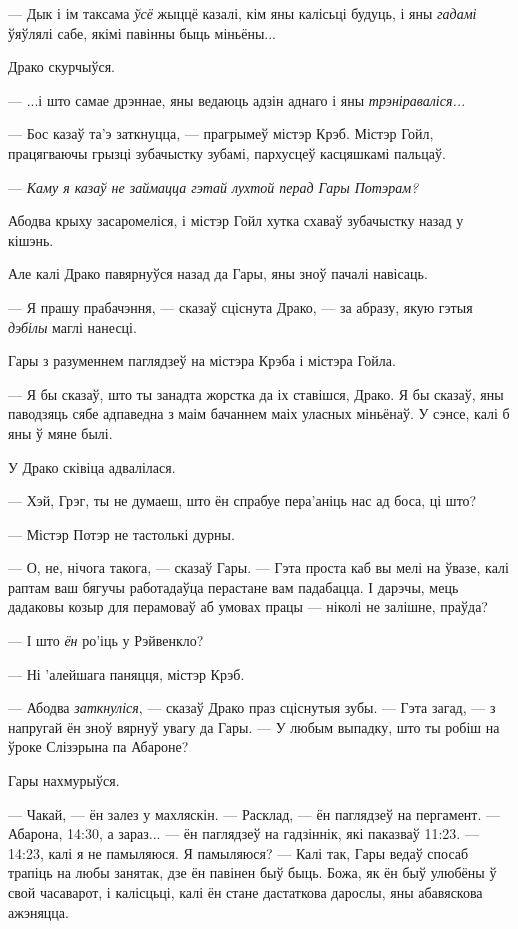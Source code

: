 --- Дык і ім таксама \emph{ўсё} жыццё казалі, кім яны калісьці будуць,
і яны \emph{гадамі} ўяўлялі сабе, якімі павінны быць міньёны...

Драко скурчыўся.

--- ...і што самае дрэннае, яны ведаюць адзін аднаго і яны \emph{трэніраваліся...}

--- Бос казаў та'э заткнуцца, --- прагрымеў містэр Крэб. Містэр Гойл, працягваючы 
грызці зубачыстку зубамі, пархусцеў касцяшкамі пальцаў.

--- \emph{Каму я казаў не займацца гэтай лухтой перад Гары Потэрам?}

Абодва крыху засаромеліся, і містэр Гойл хутка схаваў зубачыстку назад у кішэнь.

Але калі Драко павярнуўся назад да Гары, яны зноў пачалі навісаць.

--- Я прашу прабачэння, --- сказаў сціснута Драко, --- за абразу,
якую гэтыя \emph{дэбілы} маглі нанесці.

Гары з разуменнем паглядзеў на містэра Крэба і містэра Гойла. 

--- Я бы сказаў, што ты занадта жорстка да іх ставішся, Драко. Я бы сказаў, яны 
паводзяць сябе адпаведна з маім бачаннем маіх уласных міньёнаў. У сэнсе, 
калі б яны ў мяне былі.

У Драко сківіца адвалілася.

--- Хэй, Грэг, ты не думаеш, што ён спрабуе пера'аніць нас ад боса, ці што?

--- Містэр Потэр не тастолькі дурны.

--- О, не, нічога такога, --- сказаў Гары. --- Гэта проста каб вы мелі на ўвазе, 
калі раптам ваш бягучы работадаўца перастане вам падабацца. І дарэчы, мець 
дадаковы козыр для перамоваў аб умовах працы --- 
ніколі не залішне, праўда?

--- І што \emph{ён} ро'іць у Рэйвенкло?

--- Ні 'алейшага паняцця, містэр Крэб.

--- Абодва \emph{заткнуліся}, --- сказаў Драко праз сціснутыя зубы. --- Гэта загад, ---
з напругай ён зноў вярнуў увагу да Гары. --- У любым выпадку,
што ты робіш на ўроке Слізэрына па Абароне?

Гары нахмурыўся.

--- Чакай, --- ён залез у махляскін. --- Расклад, --- ён паглядзеў на пергамент.
--- Абарона, 14:30, а зараз... --- ён паглядзеў на гадзіннік, які паказваў 11:23. --- 14:23,
калі я не памыляюся. Я памыляюся? --- Калі так, Гары ведаў спосаб трапіць на любы 
занятак, дзе ён павінен быў быць. Божа, як ён быў улюбёны ў свой часаварот, і калісцьці,
калі ён стане дастаткова дарослы, яны абавяскова ажэняцца.

